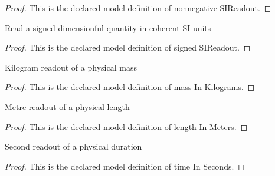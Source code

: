 \begin{proof}
  This is the declared model definition of nonnegative SIReadout.
\end{proof}
\begin{definition}
  \label{def:physics:phyx-mini-0255:phyxminiproblems-problemphyxmini0255-signedsireadout}
  Read a signed dimensionful quantity in coherent SI units
\end{definition}
\begin{proof}
  This is the declared model definition of signed SIReadout.
\end{proof}
\begin{definition}
  \label{def:physics:phyx-mini-0255:phyxminiproblems-problemphyxmini0255-massinkilograms}
  Kilogram readout of a physical mass
\end{definition}
\begin{proof}
  This is the declared model definition of mass In Kilograms.
\end{proof}
\begin{definition}
  \label{def:physics:phyx-mini-0255:phyxminiproblems-problemphyxmini0255-lengthinmeters}
  Metre readout of a physical length
\end{definition}
\begin{proof}
  This is the declared model definition of length In Meters.
\end{proof}
\begin{definition}
  \label{def:physics:phyx-mini-0255:phyxminiproblems-problemphyxmini0255-timeinseconds}
  Second readout of a physical duration
\end{definition}
\begin{proof}
  This is the declared model definition of time In Seconds.
\end{proof}
